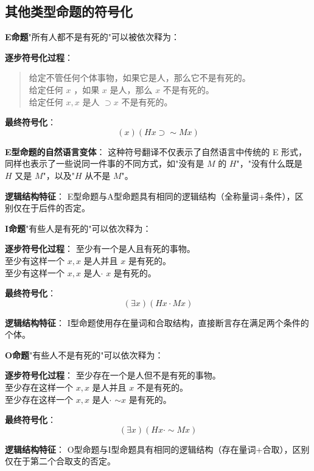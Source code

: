 \subsection{其他类型命题的符号化}

\begin{theorembox}[title=E型命题的符号化分析]
\textbf{E命题}"所有人都不是有死的"可以被依次释为：

\textbf{逐步符号化过程}：
\begin{quote}
给定不管任何个体事物，如果它是人，那么它不是有死的。\\
给定任何 $x$ ，如果 $x$ 是人，那么 $x$ 不是有死的。\\
给定任何 $x, x$ 是人 $\supset x$ 不是有死的。
\end{quote}

\textbf{最终符号化}：
$$(x)(H x \supset \sim M x)$$

\textbf{E型命题的自然语言变体}：
这种符号翻译不仅表示了自然语言中传统的 E 形式，同样也表示了一些说同一件事的不同方式，如"没有是 $M$ 的 $H$"，"没有什么既是 $H$ 又是 $M$"，以及"$H$ 从不是 $M$"。

\textbf{逻辑结构特征}：
E型命题与A型命题具有相同的逻辑结构（全称量词+条件），区别仅在于后件的否定。
\end{theorembox}

\begin{theorembox}[title=I型命题的符号化分析]
\textbf{I命题}"有些人是有死的"可以依次释为：

\textbf{逐步符号化过程}：
至少有一个是人且有死的事物。\\
至少有这样一个 $x, x$ 是人并且 $x$ 是有死的。\\
至少有这样一个 $x, x$ 是人$\cdot$ $x$ 是有死的。

\textbf{最终符号化}：
$$(\exists x)(H x \cdot M x)$$

\textbf{逻辑结构特征}：
I型命题使用存在量词和合取结构，直接断言存在满足两个条件的个体。
\end{theorembox}

\begin{theorembox}[title=O型命题的符号化分析]
\textbf{O命题}"有些人不是有死的"可以依次释为：

\textbf{逐步符号化过程}：
至少存在一个是人但不是有死的事物。\\
至少存在这样一个 $x, x$ 是人并且 $x$ 不是有死的。\\
至少存在这样一个 $x, x$ 是人$\cdot$ $\sim x$ 是有死的。

\textbf{最终符号化}：
$$(\exists x)(H x \cdot \sim M x)$$

\textbf{逻辑结构特征}：
O型命题与I型命题具有相同的逻辑结构（存在量词+合取），区别仅在于第二个合取支的否定。
\end{theorembox}

